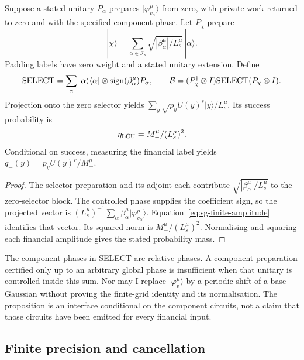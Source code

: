 \begin{proposition}
\label{prop:sg-finite-lcu}
Suppose a stated unitary $P_\alpha$ prepares
$|\varphi_{v_\alpha}^\mu\rangle$ from zero, with private work returned
to zero and with the specified component phase. Let $P_\chi$ prepare
\[
 |\chi\rangle=\sum_{\alpha\in\mathcal I_s}
           \sqrt{|\beta_\alpha^\mu|/L_s^\mu}\,|\alpha\rangle.
\]
Padding labels have zero weight and a stated unitary extension.
Define
\[
 {\rm SELECT}=\sum_\alpha|\alpha\rangle\langle\alpha|
       \otimes {\rm sign}(\beta_\alpha^\mu)P_\alpha,\qquad
 \mathcal B=(P_\chi^\dagger\otimes I)
               {\rm SELECT}(P_\chi\otimes I).
\]
Projection onto the zero selector yields
$\sum_y\sqrt{p_y}U(y)^s|y\rangle/L_s^\mu$.
Its success probability is
\begin{equation}
 \eta_{\rm LCU}=M_-^\mu/(L_s^\mu)^2.
 \label{eq:sg-finite-success}
\end{equation}
Conditional on success, measuring the financial label yields
$q_-(y)=p_yU(y)^r/M_-^\mu$.
\end{proposition}
\begin{proof}
The selector preparation and its adjoint each contribute
$\sqrt{|\beta_\alpha^\mu|/L_s^\mu}$ to the zero-selector block.
The controlled phase supplies the coefficient sign, so the projected
vector is $(L_s^\mu)^{-1}\sum_\alpha
\beta_\alpha^\mu|\varphi_{v_\alpha}^\mu\rangle$.
Equation~\eqref{eq:sg-finite-amplitude} identifies that vector.
Its squared norm is $M_-^\mu/(L_s^\mu)^2$. Normalising and squaring
each financial amplitude gives the stated probability mass.
\end{proof}

The component phases in SELECT are relative phases. A component
preparation certified only up to an arbitrary global phase is insufficient
when that unitary is controlled inside this sum. Nor may I replace
$|\varphi_v^\mu\rangle$ by a periodic shift of a base Gaussian without
proving the finite-grid identity and its normalisation. The proposition
is an interface conditional on the component circuits, not a claim that
those circuits have been emitted for every financial input.

\subsection{Finite precision and cancellation}

